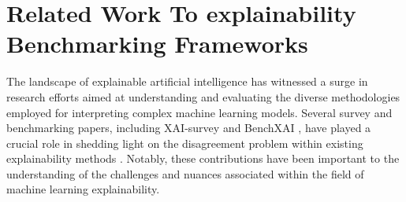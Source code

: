 \section{Related Work To explainability Benchmarking Frameworks}


The landscape of explainable artificial intelligence has witnessed a surge in research efforts aimed at understanding and evaluating the diverse methodologies employed for interpreting complex machine learning models. Several survey and benchmarking papers, including XAI-survey \cite{bodriaBenchmarkingSurveyExplanation2023a} and BenchXAI \cite{liuSyntheticBenchmarksScientific2021, liu2021synthetic}, have played a crucial role in shedding light on the disagreement problem within existing explainability methods \cite{krishnaDisagreementProblemExplainable2022, neelyOrderCourtExplainable2021, camburuCanTrustExplainer2019, hanWhichExplanationShould2022, turbeEvaluationPosthocInterpretability2023}. Notably, these contributions have been important to the understanding of the challenges and nuances associated within the field of machine learning explainability.

